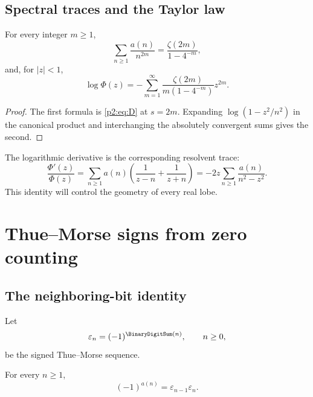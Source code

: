 \documentclass[11pt]{article}
\numberwithin{equation}{section}
\theoremstyle{definition}
\theoremstyle{remark}
\begin{document}
\subsection{Spectral traces and the Taylor law}

\begin{corollary}
\label{p2:cor:traces}
For every integer $m\ge1$,
\begin{equation}
 \sum_{n\ge1}\frac{a(n)}{n^{2m}}
 =\frac{\zeta(2m)}{1-4^{-m}},                              \label{p2:eq:trace}
\end{equation}
and, for $|z|<1$,
\begin{equation}
 \log\Phi(z)
 =-\sum_{m=1}^{\infty}
 \frac{\zeta(2m)}{m(1-4^{-m})}z^{2m}.                    \label{p2:eq:log-taylor}
\end{equation}
\end{corollary}

\begin{proof}
The first formula is \eqref{p2:eq:D} at $s=2m$.  Expanding
$\log(1-z^2/n^2)$ in the canonical product and interchanging the absolutely
convergent sums gives the second.
\end{proof}

The logarithmic derivative is the corresponding resolvent trace:
\begin{equation}
 \frac{\Phi'(z)}{\Phi(z)}
 =\sum_{n\ge1}a(n)\left(\frac1{z-n}+\frac1{z+n}\right)
 =-2z\sum_{n\ge1}\frac{a(n)}{n^2-z^2}.                   \label{p2:eq:logder}
\end{equation}
This identity will control the geometry of every real lobe.

\section{Thue--Morse signs from zero counting}
\label{p2:sec:signs}

\subsection{The neighboring-bit identity}

Let
\begin{equation}
 \varepsilon_n=(-1)^{\BinaryDigitSum(n)},\qquad n\ge0,                 \label{p2:eq:eps}
\end{equation}
be the signed Thue--Morse sequence.

\begin{lemma}
\label{p2:lem:parity}
For every $n\ge1$,
\begin{equation}
 (-1)^{a(n)}=\varepsilon_{n-1}\varepsilon_n.              \label{p2:eq:neighbor}
\end{equation}
\end{lemma}
\end{document}
